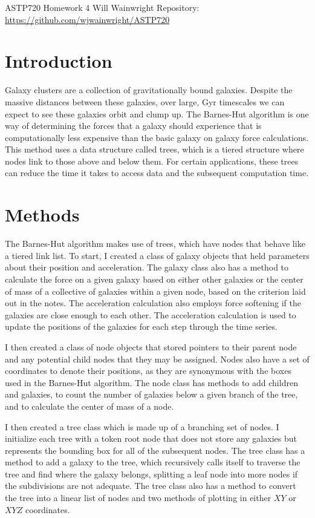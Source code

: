 \documentclass[twocolumn,11pt]{article}
\begin{document}
\pagestyle{plain}
\onecolumn
ASTP720 
\newline Homework 4
\newline Will Wainwright
\newline Repository: \href{https://github.com/wjwainwright/ASTP720}{https://github.com/wjwainwright/ASTP720}

\section*{Introduction}
Galaxy clusters are a collection of gravitationally bound galaxies. Despite the massive distances between these galaxies, over large, Gyr timescales we can expect to see these galaxies orbit and clump up. The Barnes-Hut algorithm is one way of determining the forces that a galaxy should experience that is computationally less expensive than the basic galaxy on galaxy force calculations. This method uses a data structure called trees, which is a tiered structure where nodes link to those above and below them. For certain applications, these trees can reduce the time it takes to access data and the subsequent computation time.

\section*{Methods}
The Barnes-Hut algorithm makes use of trees, which have nodes that behave like a tiered link list. To start, I created a class of galaxy objects that held parameters about their position and acceleration. The galaxy class also has a method to calculate the force on a given galaxy based on either other galaxies or the center of mass of a collective of galaxies within a given node, based on the criterion laid out in the notes. The acceleration calculation also employs force softening if the galaxies are close enough to each other. The acceleration calculation is used to update the positions of the galaxies for each step through the time series.

I then created a class of node objects that stored pointers to their parent node and any potential child nodes that they may be assigned. Nodes also have a set of coordinates to denote their positions, as they are synonymous with the boxes used in the Barnes-Hut algorithm. The node class has methods to add children and galaxies, to count the number of galaxies below a given branch of the tree, and to calculate the center of mass of a node.

I then created a tree class which is made up of a branching set of nodes. I initialize each tree with a token root node that does not store any galaxies but represents the bounding box for all of the subsequent nodes. The tree class has a method to add a galaxy to the tree, which recursively calls itself to traverse the tree and find where the galaxy belongs, splitting a leaf node into more nodes if the subdivisions are not adequate. The tree class also has a method to convert the tree into a linear list of nodes and two methods of plotting in either $XY$ or $XYZ$ coordinates.
\end{document}

